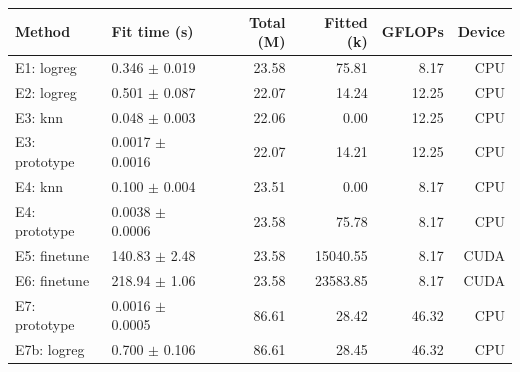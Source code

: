 \begin{tabular}{@{}llrrrr@{}}
\toprule
Method & Fit time (s) & Total (M) & Fitted (k) & GFLOPs & Device \\
\midrule
E1: logreg & 0.346 $\pm$ 0.019 & 23.58 & 75.81 & 8.17 & CPU \\
E2: logreg & 0.501 $\pm$ 0.087 & 22.07 & 14.24 & 12.25 & CPU \\
E3: knn & 0.048 $\pm$ 0.003 & 22.06 & 0.00 & 12.25 & CPU \\
E3: prototype & 0.0017 $\pm$ 0.0016 & 22.07 & 14.21 & 12.25 & CPU \\
E4: knn & 0.100 $\pm$ 0.004 & 23.51 & 0.00 & 8.17 & CPU \\
E4: prototype & 0.0038 $\pm$ 0.0006 & 23.58 & 75.78 & 8.17 & CPU \\
E5: finetune & 140.83 $\pm$ 2.48 & 23.58 & 15040.55 & 8.17 & CUDA \\
E6: finetune & 218.94 $\pm$ 1.06 & 23.58 & 23583.85 & 8.17 & CUDA \\
E7: prototype & 0.0016 $\pm$ 0.0005 & 86.61 & 28.42 & 46.32 & CPU \\
E7b: logreg & 0.700 $\pm$ 0.106 & 86.61 & 28.45 & 46.32 & CPU \\
\bottomrule
\end{tabular}
